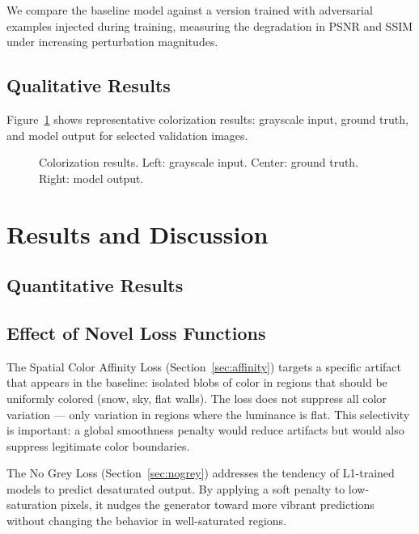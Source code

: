 \documentclass[12pt, a4paper, oneside]{report}
\begin{document}
We compare the baseline model against a version trained with adversarial examples
injected during training, measuring the degradation in PSNR and SSIM under
increasing perturbation magnitudes.

\section{Qualitative Results}

Figure~\ref{fig:results} shows representative colorization results: grayscale input,
ground truth, and model output for selected validation images.

\begin{figure}[H]
    \centering
    \caption{Colorization results. Left: grayscale input. Center: ground truth. Right: model output.}
    \label{fig:results}
\end{figure}


\chapter{Results and Discussion}
\label{ch:discussion}

\section{Quantitative Results}

\section{Effect of Novel Loss Functions}

The Spatial Color Affinity Loss (Section~\ref{sec:affinity}) targets a specific
artifact that appears in the baseline: isolated blobs of color in regions that should
be uniformly colored (snow, sky, flat walls). The loss does not suppress all color
variation — only variation in regions where the luminance is flat. This selectivity
is important: a global smoothness penalty would reduce artifacts but would also
suppress legitimate color boundaries.

The No Grey Loss (Section~\ref{sec:nogrey}) addresses the tendency of L1-trained
models to predict desaturated output. By applying a soft penalty to low-saturation
pixels, it nudges the generator toward more vibrant predictions without changing
the behavior in well-saturated regions.
\end{document}
